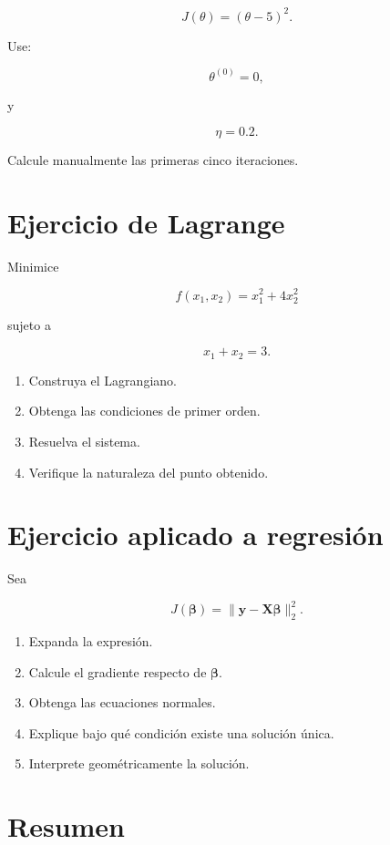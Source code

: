\documentclass[
  spanish,
  11pt,
  letterpaper,
  DIV=11,
  numbers=noendperiod]{scrreprt}
\providecommand{\tightlist}{%
  \setlength{\itemsep}{0pt}\setlength{\parskip}{0pt}}
\theoremstyle{definition}
\theoremstyle{plain}
\theoremstyle{definition}
\theoremstyle{remark}
\begin{document}
\[
J(\theta)
=
(\theta-5)^2.
\]

Use:

\[
\theta^{(0)}=0,
\]

y

\[
\eta=0.2.
\]

Calcule manualmente las primeras cinco iteraciones.

\section{Ejercicio de Lagrange}\label{ejercicio-de-lagrange}

Minimice

\[
f(x_1,x_2)
=
x_1^2+4x_2^2
\]

sujeto a

\[
x_1+x_2=3.
\]

\begin{enumerate}
\def\labelenumi{\arabic{enumi}.}
\tightlist
\item
  Construya el Lagrangiano.
\item
  Obtenga las condiciones de primer orden.
\item
  Resuelva el sistema.
\item
  Verifique la naturaleza del punto obtenido.
\end{enumerate}

\section{Ejercicio aplicado a
regresión}\label{ejercicio-aplicado-a-regresiuxf3n}

Sea

\[
J(\boldsymbol{\beta})
=
\|
\mathbf{y}
-
\mathbf{X}\boldsymbol{\beta}
\|_2^2.
\]

\begin{enumerate}
\def\labelenumi{\arabic{enumi}.}
\tightlist
\item
  Expanda la expresión.
\item
  Calcule el gradiente respecto de \(\boldsymbol{\beta}\).
\item
  Obtenga las ecuaciones normales.
\item
  Explique bajo qué condición existe una solución única.
\item
  Interprete geométricamente la solución.
\end{enumerate}

\section{Resumen}\label{resumen-3}
\end{document}
